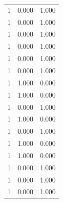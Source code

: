 \begin{tabular}{rrr}
1 & 0.000 & 1.000 \\
1 & 0.000 & 1.000 \\
1 & 0.000 & 1.000 \\
1 & 0.000 & 1.000 \\
1 & 0.000 & 1.000 \\
1 & 0.000 & 1.000 \\
1 & 1.000 & 0.000 \\
1 & 1.000 & 0.000 \\
1 & 0.000 & 1.000 \\
1 & 1.000 & 0.000 \\
1 & 0.000 & 1.000 \\
1 & 1.000 & 0.000 \\
1 & 1.000 & 0.000 \\
1 & 0.000 & 1.000 \\
1 & 0.000 & 1.000 \\
1 & 0.000 & 1.000 \\
\bottomrule
\end{tabular}
